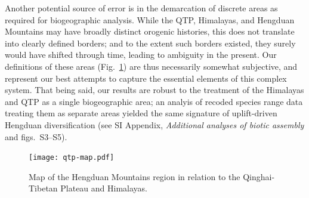 \documentclass[9pt,twocolumn,twoside,lineno]{pnas-new}
\begin{document}
Another potential source of error is in the demarcation of discrete
areas as required for biogeographic analysis. While the QTP,
Himalayas, and Hengduan Mountains may have broadly distinct orogenic
histories, this does not translate into clearly defined borders; and
to the extent such borders existed, they surely would have shifted
through time, leading to ambiguity in the present. Our definitions of
these areas (Fig.~\ref{fig:map}) are thus necessarily somewhat
subjective, and represent our best attempts to capture the essential
elements of this complex system. That being said, our results are
robust to the treatment of the Himalayas and QTP as a single
biogeographic area; an analyis of recoded species range data treating
them as separate areas yielded the same signature of uplift-driven
Hengduan diversification (see SI Appendix, \textit{Additional analyses
  of biotic assembly} and figs.\ S3--S5).



\begin{figure}
\centering
\texttt{[image: qtp-map.pdf]}
\caption{Map of the Hengduan Mountains region in relation to the
  Qinghai-Tibetan Plateau and Himalayas.}
\label{fig:map}
\end{figure}
\end{document}
